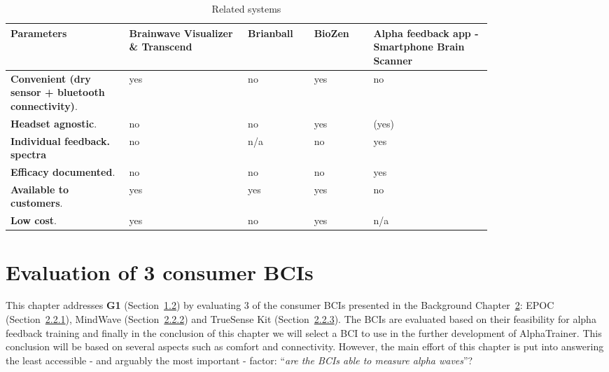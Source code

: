 \documentclass[a4paper,10pt,english,lof,lot,twoside]{puthesis}
\begin{document}
\begin{table}
\capstart
\begin{center}

\bodyspacing

\begin{tabular}{>{\raggedright\arraybackslash}p{0.20\linewidth} p{0.20\linewidth} p{0.10\linewidth} p{0.10\linewidth}  p{0.20\linewidth}}

\toprule
\textsf{\relax 
Parameters
} & \textsf{\relax 
Brainwave Visualizer \&
Transcend
} & \textsf{\relax 
Brianball
} & \textsf{\relax 
BioZen
} & \textsf{\relax 
Alpha feedback app -
Smartphone Brain Scanner
}\\
\hline\midrule

\textbf{Convenient (dry sensor +
bluetooth connectivity)}.
 & 
yes
 & 
no
 & 
yes
 & 
no
\\

\textbf{Headset agnostic}.
 & 
no
 & 
no
 & 
yes
 & 
(yes)
\\

\textbf{Individual feedback.
spectra}
 & 
no
 & 
n/a
 & 
no
 & 
yes
\\

\textbf{Efficacy documented}.
 & 
no
 & 
no
 & 
no
 & 
yes
\\

\textbf{Available to customers}.
 & 
yes
 & 
yes
 & 
yes
 & 
no
\\

\textbf{Low cost}.
 & 
yes
 & 
no
 & 
yes
 & 
n/a
\\
\hline\bottomrule

\end{tabular}
\caption[Related systems]{Related systems}\label{ch-background/index:table-related-systems}
\end{center}
\end{table}


\chapter{Evaluation of 3 consumer BCIs}
\label{ch-experiment/index:ch-experiment}\label{ch-experiment/index::doc}\label{ch-experiment/index:evaluation-of-3-consumer-bcis}
This chapter addresses \textbf{G1} (Section {\hyperref[ch-intro/index:ch-intro-hypothesis-goals]{1.2}})
by evaluating 3 of the consumer BCIs presented in the Background Chapter {\hyperref[ch-background/index:ch-background]{2}}: EPOC (Section {\hyperref[ch-background/index:ch-background-epoc]{2.2.1}}), MindWave (Section {\hyperref[ch-background/index:ch-background-mindwave]{2.2.2}}) and TrueSense Kit (Section {\hyperref[ch-background/index:ch-background-truesense-kit]{2.2.3}}).  The BCIs are evaluated based on their
feasibility for alpha feedback training and finally in the conclusion of this
chapter we will select a BCI to use in the further development of
AlphaTrainer. This conclusion will be based on several aspects such as comfort
and connectivity. However, the main effort of this chapter is put into answering
the least accessible - and arguably the most important - factor: ``\emph{are the
BCIs able to measure alpha waves}''?
\end{document}
